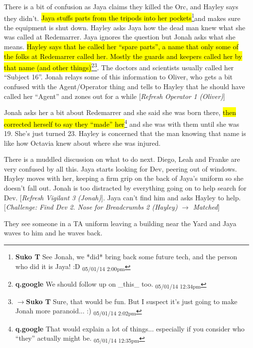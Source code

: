 There is a bit of confusion as Jaya claims they killed the Orc, and Hayley says they didn't.  \hl{Jaya stuffs parts from the tripods into her pockets}\footnote{\textbf{Suko T }See Jonah, we *did* bring back some future tech, and the person who did it is Jaya! :D \textsubscript{05/01/14 2:00pm}}and makes sure the equipment is shut down.  Hayley asks Jaya how the dead man knew what she was called at Redemarrer.  Jaya ignores the question but Jonah asks what she means.  \hl{Hayley says that he called her ``spare parts'', a name that only some of the folks at Redemarrer called her.  Mostly the guards and keepers called her by that name (and other things)}\footnote{\textbf{q.google }We should follow up on \_this\_ too. \textsubscript{05/01/14 12:34pm}}\footnote{$\rightarrow$\textbf{Suko T }Sure, that would be fun.  But I suspect it's just going to make Jonah more paranoid... :) \textsubscript{05/01/14 2:02pm}}.  The doctors and scientists usually called her ``Subject 16''.  Jonah relays some of this information to Oliver, who gets a bit confused with the Agent/Operator thing and tells to Hayley that he should have called her ``Agent'' and zones out for a while {[}\textit{Refresh Operator 1 (Oliver)}{]}



Jonah asks her a bit about Redemarrer and she said she was born there, \hl{then corrected herself to say they ``made'' her}\footnote{\textbf{q.google }That would explain a lot of things... especially if you consider who ``they'' actually might be. \textsubscript{05/01/14 12:35pm}} and she was with them until she was 19.  She's just turned 23.   Hayley is concerned that the man knowing that name is like how Octavia knew about where she was injured. 



There is a muddled discussion on what to do next.  Diego, Leah and Franke are very confused by all this.  Jaya starts looking for Dev, peering out of windows.  Hayley moves with her, keeping a firm grip on the back of Jaya's uniform so she doesn't fall out.  Jonah is too distracted by everything going on to help search for Dev. {[}\textit{Refresh Vigilant 3 (Jonah)}{]}.  Jaya can't find him and asks Hayley to help.  {[}\textit{Challenge: Find Dev 2. Nose for Breadcrumbs 2 (Hayley) $\rightarrow$ Matched}{]}



They see someone in a TA uniform leaving a building near the Yard and Jaya waves to him and he waves back.




